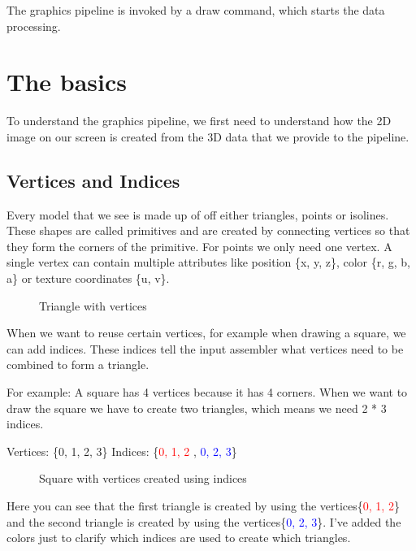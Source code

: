 \documentclass[12pt]{report} \usepackage{preamble}
\begin{document}
The graphics pipeline is invoked by a draw command, which starts the
data processing. \cite{build-pipeline}

\section{The basics}

To understand the graphics pipeline, we first need to understand
how the 2D image on our screen is created from the 3D data that we
provide to the pipeline.

\subsection{Vertices and Indices}

Every model that we see is made up of off either triangles, points or
isolines. These shapes are called primitives and are created by connecting
vertices so that they form the corners of the primitive. For points we
only need one vertex.
A single vertex can contain multiple attributes like position \{x, y, z\},
color \{r, g, b, a\} or texture coordinates \{u, v\}. \cite{vulkan-vertex-input}

\begin{figure}[hbtp]
	\centering 
	\caption{Triangle with vertices}
\end{figure} \Floatbarrier

When we want to reuse certain vertices, for example when
drawing a square, we can add indices.  These indices tell the
input assembler what vertices need to be combined to form a
triangle. \cite{vulkan-tutorial-index-buffer}

For example: A square has 4 vertices because it has 4 corners. When we want
to draw the square we have to create two triangles, which means we need 2 *
3 indices.

Vertices: \{0, 1, 2, 3\} Indices: \{\textcolor{red}{0, 1, 2} ,
\textcolor{blue}{0, 2, 3}\}

\begin{figure}[hbtp]
	\centering 
	\caption{Square
		with vertices created using indices}
\end{figure} \Floatbarrier

Here you can see that the first triangle is created by using the
vertices\{\textcolor{red}{0, 1, 2}\} and the second triangle is created by using
the vertices\{\textcolor{blue}{0, 2, 3}\}. I've added the colors just
to clarify which indices are used to create which triangles.
\end{document}
